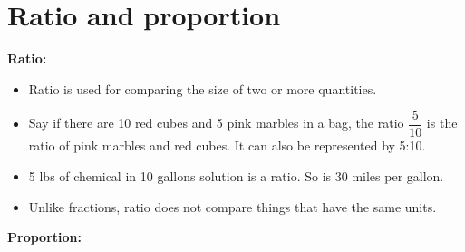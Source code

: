 \section{Ratio and proportion}
\textbf{Ratio:}\\
\begin{itemize}
\item Ratio is used for comparing the size of two or more quantities.
\item Say if there are 10 red cubes and 5 pink marbles in a bag, the ratio $\dfrac{5}{10}$ is the ratio of pink marbles and red cubes.  It can also be represented by 5:10.
\item 5 lbs of chemical in 10 gallons solution is a ratio.  So is 30 miles per gallon.
\item Unlike fractions, ratio does not compare things that have the same units.
\end{itemize}
\textbf{Proportion:}\\
